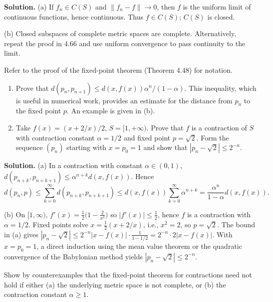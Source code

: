 \noindent\textbf{Solution.}
(a) If $f_n\in C(S)$ and $\|f_n-f\|\to 0$, then $f$ is the uniform limit of continuous functions, hence continuous. Thus $f\in C(S)$; $C(S)$ is closed.

(b) Closed subspaces of complete metric spaces are complete. Alternatively, repeat the proof in 4.66 and use uniform convergence to pass continuity to the limit.
\medskip

\begin{problembox}
Refer to the proof of the fixed-point theorem (Theorem 4.48) for notation.
\begin{enumerate}[label=(\alph*)]
\item Prove that $d(p_n, p_{n+1}) \leq d(x, f(x)) \alpha^n / (1 - \alpha)$. This inequality, which is useful in numerical work, provides an estimate for the distance from $p_n$ to the fixed point $p$. An example is given in (b).
\item Take $f(x) = (x + 2/x)/2$, $S = [1, +\infty)$. Prove that $f$ is a contraction of $S$ with contraction constant $\alpha = 1/2$ and fixed point $p = \sqrt{2}$. Form the sequence $(p_n)$ starting with $x=p_0=1$ and show that $|p_n - \sqrt{2}| \le 2^{-n}$.
\end{enumerate}
\end{problembox}

\noindent\textbf{Solution.}
(a) In a contraction with constant $\alpha\in(0,1)$, $d(p_{n+k},p_{n+k+1})\le \alpha^{n+k}d(x,f(x))$. Hence
\[
d(p_n,p)\le \sum_{k=0}^{\infty} d(p_{n+k},p_{n+k+1})\le d(x,f(x))\sum_{k=0}^{\infty}\alpha^{n+k}=\frac{\alpha^n}{1-\alpha}d(x,f(x)).
\]

(b) On $[1,\infty)$, $f'(x)=\tfrac12\big(1-\tfrac{2}{x^2}\big)$ so $|f'(x)|\le \tfrac12$, hence $f$ is a contraction with $\alpha=1/2$. Fixed points solve $x=\tfrac12(x+2/x)$, i.e., $x^2=2$, so $p=\sqrt2$. The bound in (a) gives $|p_n-\sqrt2|\le 2^{-n}|x-f(x)|\cdot\tfrac{1}{1-1/2}=2^{-n}\cdot 2|x-f(x)|$. With $x=p_0=1$, a direct induction using the mean value theorem or the quadratic convergence of the Babylonian method yields $|p_n-\sqrt2|\le 2^{-n}$.
\medskip

\begin{problembox}
Show by counterexamples that the fixed-point theorem for contractions need not hold if either (a) the underlying metric space is not complete, or (b) the contraction constant $\alpha \ge 1$.
\end{problembox}

